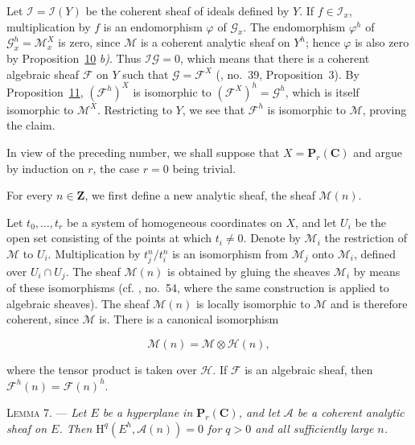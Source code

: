 Let $\mathcal{I}=\mathcal{I}(Y)$ be the coherent sheaf of ideals defined by $Y$. If $f\in\mathcal{I}_x$, multiplication by $f$ is an endomorphism $\varphi$ of $\mathcal{G}_x$. The endomorphism $\varphi^h$ of $\mathcal{G}^h_x=\mathcal{M}^X_x$ is zero, since $\mathcal{M}$ is a coherent analytic sheaf on $Y^h$; hence $\varphi$ is also zero by Proposition~\hyperref[gaga:prop:10]{10} \emph{b)}. Thus $\mathcal{I}\mathcal{G}=0$, which means that there is a coherent algebraic sheaf $\mathcal{F}$ on $Y$ such that $\mathcal{G}=\mathcal{F}^X$ (, no.~39, Proposition~3). By Proposition~\hyperref[gaga:prop:11]{11}, $(\mathcal{F}^h)^X$ is isomorphic to $(\mathcal{F}^X)^h=\mathcal{G}^h$, which is itself isomorphic to $\mathcal{M}^X$. Restricting to $Y$, we see that $\mathcal{F}^h$ is isomorphic to $\mathcal{M}$, proving the claim.


In view of the preceding number, we shall suppose that $X=\mathbf{P}_r(\mathbf{C})$ and argue by induction on $r$, the case $r=0$ being trivial.

For every $n\in\mathbf{Z}$, we first define a new analytic sheaf, the sheaf $\mathcal{M}(n)$.

Let $t_0,\ldots,t_r$ be a system of homogeneous coordinates on $X$, and let $U_i$ be the open set consisting of the points at which $t_i\neq0$. Denote by $\mathcal{M}_i$ the restriction of $\mathcal{M}$ to $U_i$. Multiplication by $t_j^n/t_i^n$ is an isomorphism from $\mathcal{M}_j$ onto $\mathcal{M}_i$, defined over $U_i\cap U_j$. The sheaf $\mathcal{M}(n)$ is obtained by gluing the sheaves $\mathcal{M}_i$ by means of these isomorphisms (cf. , no.~54, where the same construction is applied to algebraic sheaves). The sheaf $\mathcal{M}(n)$ is locally isomorphic to $\mathcal{M}$ and is therefore coherent, since $\mathcal{M}$ is. There is a canonical isomorphism

\begin{equation*}
\mathcal{M}(n)=\mathcal{M}\otimes\mathcal{H}(n),
\end{equation*}

where the tensor product is taken over $\mathcal{H}$. If $\mathcal{F}$ is an algebraic sheaf, then $\mathcal{F}^h(n)=\mathcal{F}(n)^h$.

\textsc{Lemma 7}. --- \emph{Let $E$ be a hyperplane in $\mathbf{P}_r(\mathbf{C})$, and let $\mathcal{A}$ be a coherent analytic sheaf on $E$. Then $\mathrm{H}^q(E^h,\mathcal{A}(n))=0$ for $q>0$ and all sufficiently large $n$.}

